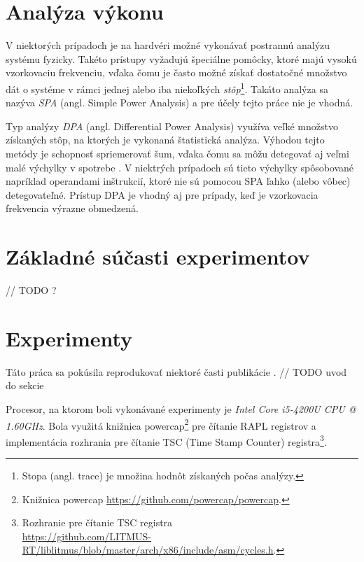 \section{Analýza výkonu}
V niektorých prípadoch je na hardvéri možné vykonávať postrannú analýzu systému fyzicky. Takéto prístupy vyžadujú špeciálne pomôcky,
ktoré majú vysokú vzorkovaciu frekvenciu, vďaka čomu je často možné získať dostatočné množstvo dát o systéme v rámci jednej alebo
iba niekoľkých \emph{stôp}\footnote{Stopa (angl. trace) je množina hodnôt získaných počas analýzy.}.
Takáto analýza sa nazýva \emph{SPA} (angl. Simple Power Analysis) a pre účely tejto práce nie je vhodná.

Typ analýzy \emph{DPA} (angl. Differential Power Analysis) využíva veľké množstvo získaných stôp, na ktorých je vykonaná štatistická analýza.
Výhodou tejto metódy je schopnosť spriemerovať šum, vďaka čomu sa môžu detegovať aj veľmi malé výchylky v spotrebe \cite{Platypus}. V niektrých prípadoch sú tieto
výchylky spôsobované napríklad operandami inštrukcií, ktoré nie sú pomocou SPA ľahko (alebo vôbec) detegovateľné. Prístup DPA je vhodný aj pre
prípady, keď je vzorkovacia frekvencia výrazne obmedzená.


\section{Základné súčasti experimentov}
// TODO ?

\section{Experimenty}
Táto práca sa pokúsila reprodukovať niektoré časti publikácie \cite{Platypus}.
// TODO uvod do sekcie

Procesor, na ktorom boli vykonávané experimenty je \emph{Intel Core i5-4200U CPU @ 1.60GHz}. Bola využitá knižnica
powercap\footnote{Knižnica powercap \href{https://github.com/powercap/powercap}{https://github.com/powercap/powercap}.} pre čítanie RAPL registrov
a implementácia rozhrania pre čítanie TSC (Time Stamp Counter) registra\footnote{Rozhranie pre čítanie TSC registra\\\href{https://github.com/LITMUS-RT/liblitmus/blob/master/arch/x86/include/asm/cycles.h}{https://github.com/LITMUS-RT/liblitmus/blob/master/arch/x86/include/asm/cycles.h}.}.

